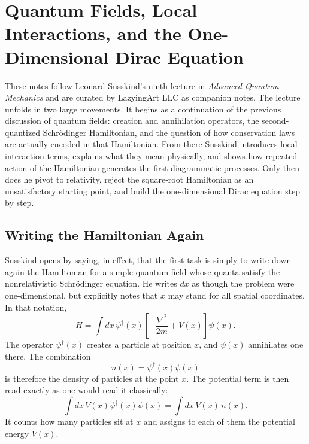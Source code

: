 \chapter{Quantum Fields, Local Interactions, and the One-Dimensional Dirac Equation}

These notes follow Leonard Susskind's ninth lecture in \emph{Advanced Quantum Mechanics} and are curated by LazyingArt LLC as companion notes. The lecture unfolds in two large movements. It begins as a continuation of the previous discussion of quantum fields: creation and annihilation operators, the second-quantized Schr\"odinger Hamiltonian, and the question of how conservation laws are actually encoded in that Hamiltonian. From there Susskind introduces local interaction terms, explains what they mean physically, and shows how repeated action of the Hamiltonian generates the first diagrammatic processes. Only then does he pivot to relativity, reject the square-root Hamiltonian as an unsatisfactory starting point, and build the one-dimensional Dirac equation step by step.

\section{Writing the Hamiltonian Again}

Susskind opens by saying, in effect, that the first task is simply to write down again the Hamiltonian for a simple quantum field whose quanta satisfy the nonrelativistic Schr\"odinger equation. He writes \(dx\) as though the problem were one-dimensional, but explicitly notes that \(x\) may stand for all spatial coordinates. In that notation,
\begin{equation}
H=\int dx\,\psi^\dagger(x)\left[-\frac{\nabla^2}{2m}+V(x)\right]\psi(x).
\end{equation}
The operator \(\psi^\dagger(x)\) creates a particle at position \(x\), and \(\psi(x)\) annihilates one there. The combination
\begin{equation}
n(x)=\psi^\dagger(x)\psi(x)
\end{equation}
is therefore the density of particles at the point \(x\). The potential term is then read exactly as one would read it classically:
\begin{equation}
\int dx\,V(x)\psi^\dagger(x)\psi(x)=\int dx\,V(x)\,n(x).
\end{equation}
It counts how many particles sit at \(x\) and assigns to each of them the potential energy \(V(x)\).

